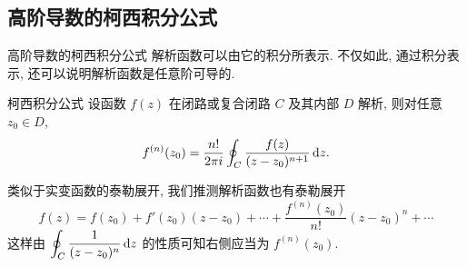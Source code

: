 

\subsection{高阶导数的柯西积分公式}
\begin{frame}{高阶导数的柯西积分公式}
\onslide<+->
解析函数可以由它的积分所表示.
\onslide<+->
不仅如此, 通过积分表示, 还可以说明\alert{解析函数是任意阶可导的}.

\onslide<+->
\begin{block}{柯西积分公式}
设函数 $f(z)$ 在闭路或复合闭路 $C$ 及其内部 $D$ 解析, 则对任意 $z_0\in D$,
\[f^{(n)}(z_0)=\frac{n!}{2\pi i}\oint_C\frac{f(z)}{(z-z_0)^{n+1}}\,\mathrm{d} z.\]
\end{block}
\onslide<+->
\noindent
类似于实变函数的泰勒展开, 我们推测解析函数也有泰勒展开
\[f(z)=f(z_0)+f'(z_0)(z-z_0)+\cdots+\frac{f^{(n)}(z_0)}{n!}(z-z_0)^n+\cdots\]
\onslide<+->
这样由 $\displaystyle\oint_C \frac1{(z-z_0)^n}\,\mathrm{d} z$ 的性质可知右侧应当为 $f^{(n)}(z_0)$.
\end{frame}


